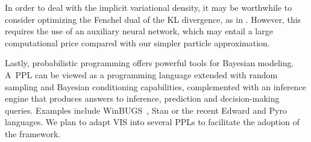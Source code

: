 In order to deal with the implicit variational density, it may be worthwhile to consider optimizing the Fenchel dual of the KL divergence, as
 in \cite{fang2019implicit}. However, this requires the use of an auxiliary neural network, which may entail a large computational price compared with our simpler particle approximation.


Lastly, probabilistic programming offers powerful tools for Bayesian modeling.
A~PPL can be viewed as a programming language extended with random sampling and Bayesian conditioning capabilities, complemented with an inference engine that produces answers to inference, prediction and decision-making queries. Examples 
include WinBUGS~\cite{lunn2000winbugs}, Stan \cite{carpenter2017stan} or the recent Edward \cite{tran2018simple} and Pyro \cite{bingham2018pyro} languages. We plan to adapt VIS into several PPLs to facilitate the adoption of the framework.







